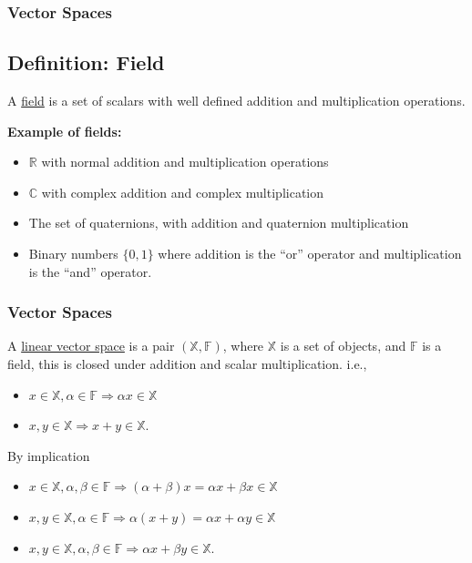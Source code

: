 \documentclass{beamer}
\begin{document}
\begin{frame}\frametitle{Vector Spaces}


\subsection*{Definition: Field} A \underline{field} is a set of scalars with well defined addition and multiplication operations.

{\bf Example of fields:}  
\begin{itemize}
\item $\mathbb{R}$ with normal addition and multiplication operations
\item $\mathbb{C}$ with complex addition and complex multiplication
\item The set of quaternions, with addition and quaternion multiplication
\item Binary numbers $\{0, 1\}$ where addition is the ``or'' operator and multiplication is the ``and'' operator.
\end{itemize}
\end{frame}

\begin{frame}\frametitle{Vector Spaces}

\begin{definition} A \underline{linear vector space} is a pair $(\mathbb{X},\mathbb{F})$, where  $\mathbb{X}$ is a set of objects, and $\mathbb{F}$ is a field, this is closed under addition and scalar multiplication. i.e., \\
\begin{itemize}
\item $x\in\mathbb{X}, \alpha \in \mathbb{F} \Rightarrow \alpha x \in \mathbb{X}$
\item $x,y \in \mathbb{X} \Rightarrow x+y\in\mathbb{X}$.
\end{itemize}
\end{definition}
By implication
\begin{itemize}
\item $x\in\mathbb{X}, \alpha,\beta\in\mathbb{F} \Rightarrow (\alpha + \beta)x = \alpha x + \beta x \in \mathbb{X}$
\item $x,y\in\mathbb{X}, \alpha\in\mathbb{F} \Rightarrow \alpha(x + y) = \alpha x + \alpha y \in\mathbb{X}$
\item $x,y\in\mathbb{X}, \alpha,\beta\in\mathbb{F} \Rightarrow \alpha x + \beta y \in \mathbb{X}$.
\end{itemize}
\end{frame}
\end{document}

